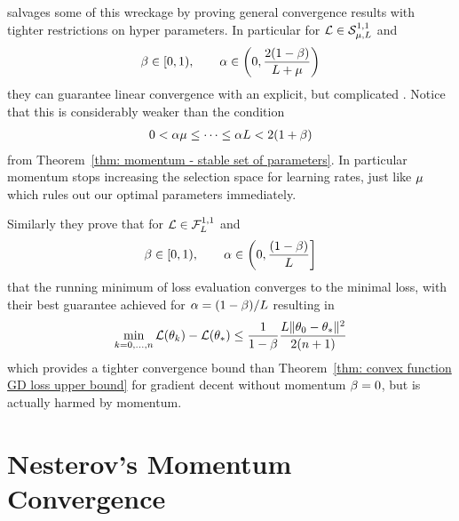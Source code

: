 \textcite{ghadimiGlobalConvergenceHeavyball2015} salvages some of this wreckage
by proving general convergence results with tighter restrictions on hyper
parameters. In particular for \(\mathcal{L}\in\mathcal{S}^{1,1}_{{\mu},{L}}\) and
\begin{align*}
	\beta\in[0,1),
	\qquad \alpha\in \left(0, \frac{2(1-\beta)}{L+\mu}\right)
\end{align*}
they can guarantee linear convergence with an explicit, but complicated
. Notice that this is
considerably weaker than the condition
\begin{align*}
	0<\alpha\mu \le \dots \le \alpha L < 2(1+\beta)
\end{align*}
from Theorem~\ref{thm: momentum - stable set of parameters}. In particular
momentum stops increasing the selection space for learning rates, just like
\(\mu\) which rules out our optimal parameters immediately. 

Similarly they prove that for \(\mathcal{L}\in\mathcal{F}^{1,1}_{L}\) and
\begin{align*}
	\beta\in[0,1),
	\qquad \alpha\in \left(0, \frac{(1-\beta)}{L}\right]
\end{align*}
that the running minimum of loss evaluation converges to the minimal loss,
with their best guarantee achieved for \(\alpha =(1-\beta)/L\)
resulting in
\begin{align*}
	\min_{k=0,\dots,n}\mathcal{L}(\theta_k) -\mathcal{L}(\theta_*)
	\le \frac{1}{1-\beta}\frac{L\|\theta_0-\theta_*\|^2}{2(n+1)}
\end{align*}
which provides a tighter convergence bound than 
Theorem~\ref{thm: convex function GD loss upper bound} for gradient decent 
without momentum \(\beta=0\), but is actually harmed by momentum.

\section{Nesterov's Momentum Convergence}

